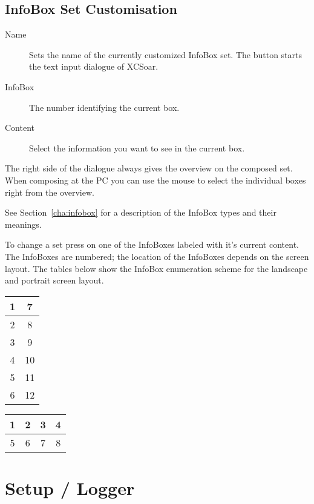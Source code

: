 \subsection*{InfoBox Set Customisation}

\begin{description}
\item[Name]  Sets the name of the currently customized InfoBox set. The 
  button starts the text input dialogue of XCSoar.
\item[InfoBox]  The number identifying the current box.
\item[Content]  Select the information you want to see in the current box.
\end{description}

The right side of the dialogue always gives the overview on the composed set. 
When composing at the PC you can use the mouse to select the individual boxes 
right from the overview.

See Section~\ref{cha:infobox} for a description of the InfoBox types and their meanings.

To change a set press on one of the InfoBoxes labeled with it's current content.
The InfoBoxes are numbered; the location of the InfoBoxes depends on the screen layout.  
The tables below show the InfoBox enumeration scheme for the
landscape and portrait screen layout.

\begin{multicols}{2}
\begin{tabular}{|c|c|}
\hline
1 & 7 \\
\hline
2 & 8 \\
\hline
3 & 9 \\
\hline
4 & 10 \\
\hline
5 & 11 \\
\hline
6 & 12 \\
\hline
\end{tabular}

\begin{tabular}{|c|c|c|c|}
\hline
1 & 2 & 3 & 4 \\
\hline
\hline
5 & 6 & 7 & 8 \\
\hline
\end{tabular}
\end{multicols}


\section{Setup / Logger} \label{conf:logger}

